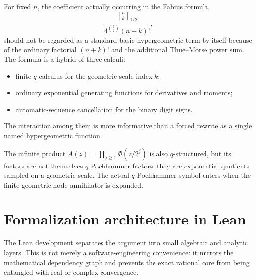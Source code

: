 \documentclass[11pt]{article}
\theoremstyle{definition}
\newcommand{\Qbin}[3]{\genfrac{[}{]}{0pt}{}{#1}{#2}_{#3}}
\begin{document}
For fixed $n$, the coefficient actually occurring in the Fabius formula,
\begin{equation}
  \frac{\Qbin{n}{k}{1/2}}{4^{\binom{k}{2}}(n+k)!},
  \label{eq:coefficient-hypergeometric-comment}
\end{equation}
should not be regarded as a standard basic hypergeometric term by itself because of the ordinary factorial $(n+k)!$ and the additional Thue--Morse power sum.  The formula is a hybrid of three calculi:
\begin{itemize}[leftmargin=2em]
  \item finite $q$-calculus for the geometric scale index $k$;
  \item ordinary exponential generating functions for derivatives and moments;
  \item automatic-sequence cancellation for the binary digit signs.
\end{itemize}
The interaction among them is more informative than a forced rewrite as a single named hypergeometric function.

The infinite product $A(z)=\prod_{j\ge1}\Phi(z/2^j)$ is also $q$-structured, but its factors are not themselves $q$-Pochhammer factors: they are exponential quotients sampled on a geometric scale.  The actual $q$-Pochhammer symbol enters when the finite geometric-node annihilator is expanded.

\section{Formalization architecture in Lean}
\label{sec:lean-architecture}

The Lean development separates the argument into small algebraic and analytic layers.  This is not merely a software-engineering convenience: it mirrors the mathematical dependency graph and prevents the exact rational core from being entangled with real or complex convergence.
\end{document}
